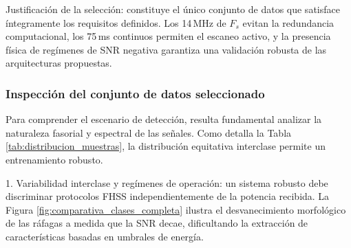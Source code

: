Justificación de la selección: constituye el único conjunto de datos que satisface íntegramente los requisitos definidos. Los 14\,MHz de $F_s$ evitan la redundancia computacional, los 75\,ms continuos permiten el escaneo activo, y la presencia física de regímenes de SNR negativa garantiza una validación robusta de las arquitecturas propuestas.

\subsubsection{Inspección del conjunto de datos seleccionado}

Para comprender el escenario de detección, resulta fundamental analizar la naturaleza fasorial y espectral de las señales. Como detalla la Tabla \ref{tab:distribucion_muestras}, la distribución equitativa interclase permite un entrenamiento robusto.

\begin{table}[htbp]
\centering
\small
\caption{Distribución de muestras en el conjunto de datos NoisyUAV v2.}
\label{tab:distribucion_muestras}
\end{table}

1. Variabilidad interclase y regímenes de operación: un sistema robusto debe discriminar protocolos FHSS independientemente de la potencia recibida. La Figura \ref{fig:comparativa_clases_completa} ilustra el desvanecimiento morfológico de las ráfagas a medida que la SNR decae, dificultando la extracción de características basadas en umbrales de energía.

